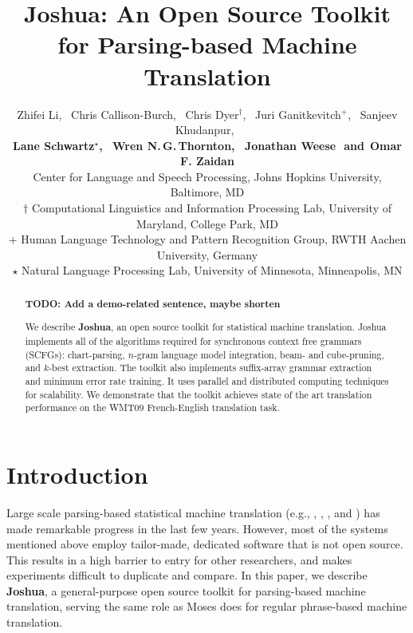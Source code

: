 \documentclass[11pt]{article}
\title{Joshua: An Open Source Toolkit for Parsing-based Machine Translation}
\author{
Zhifei Li,\,\,\,
Chris Callison-Burch,\,\,\, %
Chris Dyer$^\dagger$,\,\,\,
Juri Ganitkevitch$^+$,\,\,\,
Sanjeev Khudanpur,\,\,\, \\
{\bf Lane Schwartz$^\star$,\,\,\,
Wren N.\,G.\,Thornton,\,\,\,
Jonathan Weese\,\,
{\textnormal{and}}\,\,\,Omar F. Zaidan}\\
Center for Language and Speech Processing, Johns Hopkins University, Baltimore, MD\\
$\dagger$ Computational Linguistics and Information Processing Lab, University of Maryland, College Park, MD\\
$+$ Human Language Technology and Pattern Recognition Group, RWTH Aachen University, Germany\\
$\star$ Natural Language Processing Lab, University of Minnesota, Minneapolis, MN }
\date{}
\begin{document}
\maketitle


\begin{abstract}
\textbf{TODO: Add a demo-related sentence, maybe shorten}

We describe \textbf{Joshua}, an open source toolkit for statistical machine translation. Joshua implements all of the algorithms required for synchronous context free grammars (SCFGs): chart-parsing, $n$-gram language model integration, beam- and cube-pruning, and $k$-best extraction. The toolkit also implements suffix-array grammar extraction and minimum error rate training. It uses parallel and distributed computing techniques for scalability. We demonstrate that the toolkit achieves state of the art translation performance on the WMT09 French-English translation task.

\end{abstract}


\section{Introduction}

Large scale parsing-based statistical machine translation (e.g., , , , and ) has made remarkable progress in the last few years.
However, most of the systems mentioned above employ tailor-made, dedicated software that is not open source.  This results in a high barrier to entry for other researchers, and makes experiments difficult to duplicate and compare.
In this paper, we describe \textbf{Joshua}, a general-purpose open source toolkit for parsing-based machine translation, serving the same role as Moses \cite{Moses} does for regular phrase-based machine translation.


\end{document}
